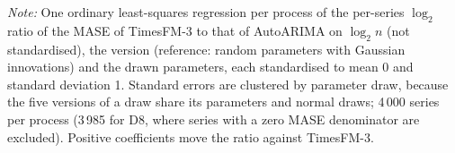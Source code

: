 \begin{table}[!htbp]
\begin{threeparttable}
\begin{tabular}{llcccc}
\bottomrule
\end{tabular}
\begin{tablenotes}[flushleft]\footnotesize
\item \textit{Note:} One ordinary least-squares regression per process of the per-series $\log_2$ ratio of the MASE of TimesFM-3 to that of AutoARIMA on $\log_2 n$ (not standardised), the version (reference: random parameters with Gaussian innovations) and the drawn parameters, each standardised to mean 0 and standard deviation 1. Standard errors are clustered by parameter draw, because the five versions of a draw share its parameters and normal draws; 4\,000 series per process (3\,985 for D8, where series with a zero MASE denominator are excluded). Positive coefficients move the ratio against TimesFM-3.
\end{tablenotes}
\end{threeparttable}
\end{table}
